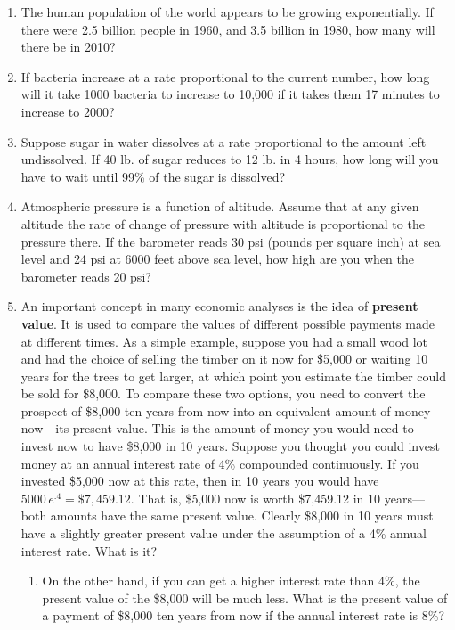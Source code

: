 \begin{enumerate}
\item The human population of the world appears to be growing
exponentially.  If there were 2.5 billion people in 1960, and 3.5
billion in 1980, how many will there be in 2010?


\item If bacteria increase at a rate proportional to the current
number, how long will it take 1000 bacteria to increase to 10,000 if
it takes them 17 minutes to increase to 2000?


\item Suppose sugar in water dissolves at a rate proportional to the
amount left undissolved.  If 40 lb. of sugar reduces to 12 lb. in 4
hours, how long will you have to wait until 99\% of the sugar is
dissolved?


\item Atmospheric pressure is a function of altitude.  Assume that at
any given altitude the rate of change of pressure with altitude is
proportional to the pressure there.  If the barometer reads 30 psi
(pounds per square inch) at sea level and 24 psi at 6000 feet above
sea level, how high are you when the barometer reads 20 psi?


\item An important concept in many economic analyses is the idea of
      {\bf present value}.  It is used to compare
      the values of different possible payments made at different
      times.  As a simple example, suppose you had a small wood lot
      and had the choice of selling the timber on it now for \$5,000
      or waiting 10 years for the trees to get larger, at which point
      you estimate the timber could be sold for \$8,000.  To compare
      these two options, you need to convert the prospect of \$8,000
      ten years from now into an equivalent amount of money now---its
      present value.  This is the amount of money you would need to
      invest now to have \$8,000 in 10 years.  Suppose you thought you
      could invest money at an annual interest rate of 4\% compounded
      continuously.  If you invested \$5,000 now at this rate, then in
      10 years you would have $5000\,e^{.4}=\$7,459.12$.  That is,
      \$5,000 now is worth \$7,459.12 in 10 years---both amounts have
      the same present value.  Clearly \$8,000 in 10 years must have a
      slightly greater present value under the assumption of a 4\%
      annual interest rate.  What is it?

  \begin{enumerate}
  \item On the other hand, if
      you can get a higher interest rate than 4\%, the present value
      of the \$8,000 will be much less.  What is the present value of
      a payment of \$8,000 ten years from now if the annual interest
      rate is 8\%?


\end{enumerate}
\end{enumerate}
